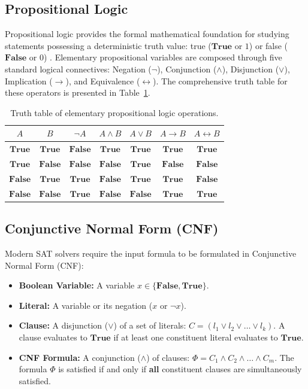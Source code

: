 \documentclass[a4paper,fleqn]{cas-sc}
\begin{document}
\subsection{Propositional Logic}
\label{subsec:prop_logic}
Propositional logic provides the formal mathematical foundation for studying statements possessing a deterministic truth value: true ($\mathbf{True}$ or $1$) or false ($\mathbf{False}$ or $0$) \cite{simon2020reasoning}. Elementary propositional variables are composed through five standard logical connectives: Negation ($\neg$), Conjunction ($\land$), Disjunction ($\lor$), Implication ($\to$), and Equivalence ($\leftrightarrow$). The comprehensive truth table for these operators is presented in Table~\ref{tab:truth_table}.

\begin{table}[pos=htbp]
\centering
\caption{Truth table of elementary propositional logic operations.}
\label{tab:truth_table}
\begin{tabular}{ccccccc}
\toprule
$A$ & $B$ & $\neg A$ & $A \land B$ & $A \lor B$ & $A \to B$ & $A \leftrightarrow B$ \\
\midrule
$\mathbf{True}$  & $\mathbf{True}$  & $\mathbf{False}$ & $\mathbf{True}$  & $\mathbf{True}$  & $\mathbf{True}$  & $\mathbf{True}$  \\
$\mathbf{True}$  & $\mathbf{False}$ & $\mathbf{False}$ & $\mathbf{False}$ & $\mathbf{True}$  & $\mathbf{False}$ & $\mathbf{False}$ \\
$\mathbf{False}$ & $\mathbf{True}$  & $\mathbf{True}$  & $\mathbf{False}$ & $\mathbf{True}$  & $\mathbf{True}$  & $\mathbf{False}$ \\
$\mathbf{False}$ & $\mathbf{False}$ & $\mathbf{True}$  & $\mathbf{False}$ & $\mathbf{False}$ & $\mathbf{True}$  & $\mathbf{True}$  \\
\bottomrule
\end{tabular}
\end{table}

\subsection{Conjunctive Normal Form (CNF)}
\label{subsec:cnf}
Modern SAT solvers require the input formula to be formulated in Conjunctive Normal Form (CNF):
\begin{itemize}
    \item \textbf{Boolean Variable:} A variable $x \in \{\mathbf{False}, \mathbf{True}\}$.
    \item \textbf{Literal:} A variable or its negation ($x$ or $\neg x$).
    \item \textbf{Clause:} A disjunction ($\lor$) of a set of literals: $C = (l_1 \lor l_2 \lor \dots \lor l_k)$. A clause evaluates to $\mathbf{True}$ if at least one constituent literal evaluates to $\mathbf{True}$.
    \item \textbf{CNF Formula:} A conjunction ($\land$) of clauses: $\Phi = C_1 \land C_2 \land \dots \land C_m$. The formula $\Phi$ is satisfied if and only if \textbf{all} constituent clauses are simultaneously satisfied.
\end{itemize}
\end{document}
